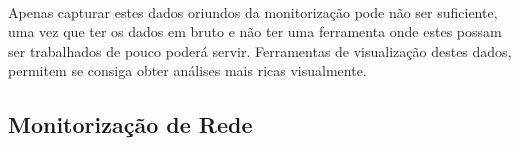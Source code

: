 \paragraph*{
}
Apenas capturar estes dados oriundos da monitorização pode não ser suficiente, uma vez que ter os dados em bruto e não ter uma ferramenta onde estes possam ser trabalhados de pouco poderá servir. Ferramentas de visualização destes dados, permitem se consiga obter análises mais ricas visualmente.

\subsection{Monitorização de Rede}\label{sect:packet_capture}

% 
% 
% 
% 
